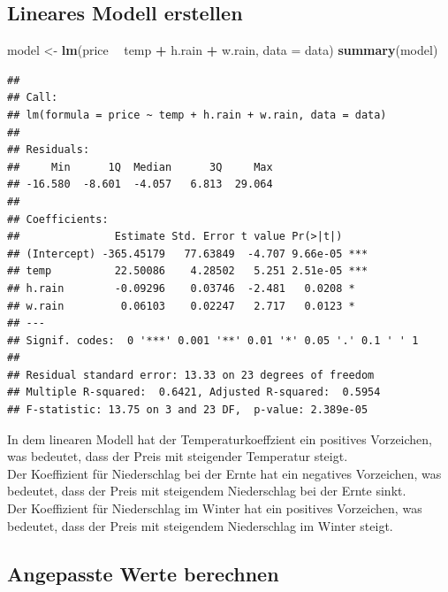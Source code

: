 \documentclass[]{article}
\newenvironment{Shaded}{\begin{snugshade}}{\end{snugshade}}
\newcommand{\DataTypeTok}[1]{\textcolor[rgb]{0.13,0.29,0.53}{#1}}
\newcommand{\KeywordTok}[1]{\textcolor[rgb]{0.13,0.29,0.53}{\textbf{#1}}}
\newcommand{\NormalTok}[1]{#1}
\newcommand{\OperatorTok}[1]{\textcolor[rgb]{0.81,0.36,0.00}{\textbf{#1}}}
\newcommand{\StringTok}[1]{\textcolor[rgb]{0.31,0.60,0.02}{#1}}
\begin{document}
\hypertarget{lineares-modell-erstellen}{%
\subsection{Lineares Modell erstellen}\label{lineares-modell-erstellen}}

\begin{Shaded}
\begin{Highlighting}[]
\NormalTok{model <-}\StringTok{ }\KeywordTok{lm}\NormalTok{(price }\OperatorTok{~}\StringTok{ }\NormalTok{temp }\OperatorTok{+}\StringTok{ }\NormalTok{h.rain }\OperatorTok{+}\StringTok{ }\NormalTok{w.rain, }\DataTypeTok{data =}\NormalTok{ data)}
\KeywordTok{summary}\NormalTok{(model)}
\end{Highlighting}
\end{Shaded}

\begin{verbatim}
## 
## Call:
## lm(formula = price ~ temp + h.rain + w.rain, data = data)
## 
## Residuals:
##     Min      1Q  Median      3Q     Max 
## -16.580  -8.601  -4.057   6.813  29.064 
## 
## Coefficients:
##               Estimate Std. Error t value Pr(>|t|)    
## (Intercept) -365.45179   77.63849  -4.707 9.66e-05 ***
## temp          22.50086    4.28502   5.251 2.51e-05 ***
## h.rain        -0.09296    0.03746  -2.481   0.0208 *  
## w.rain         0.06103    0.02247   2.717   0.0123 *  
## ---
## Signif. codes:  0 '***' 0.001 '**' 0.01 '*' 0.05 '.' 0.1 ' ' 1
## 
## Residual standard error: 13.33 on 23 degrees of freedom
## Multiple R-squared:  0.6421, Adjusted R-squared:  0.5954 
## F-statistic: 13.75 on 3 and 23 DF,  p-value: 2.389e-05
\end{verbatim}

In dem linearen Modell hat der Temperaturkoeffzient ein positives Vorzeichen, was bedeutet,
dass der Preis mit steigender Temperatur steigt.\\
Der Koeffizient für Niederschlag bei der Ernte hat ein negatives Vorzeichen, was bedeutet,
dass der Preis mit steigendem Niederschlag bei der Ernte sinkt.\\
Der Koeffizient für Niederschlag im Winter hat ein positives Vorzeichen, was bedeutet,
dass der Preis mit steigendem Niederschlag im Winter steigt.

\hypertarget{angepasste-werte-berechnen}{%
\subsection{Angepasste Werte berechnen}\label{angepasste-werte-berechnen}}
\end{document}

